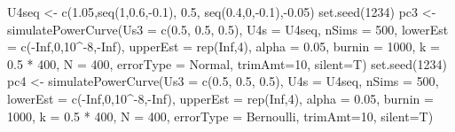 \documentclass[
]{article}
\newenvironment{Shaded}{\begin{snugshade}}{\end{snugshade}}
\newcommand{\AttributeTok}[1]{\textcolor[rgb]{0.77,0.63,0.00}{#1}}
\newcommand{\ConstantTok}[1]{\textcolor[rgb]{0.00,0.00,0.00}{#1}}
\newcommand{\DecValTok}[1]{\textcolor[rgb]{0.00,0.00,0.81}{#1}}
\newcommand{\FloatTok}[1]{\textcolor[rgb]{0.00,0.00,0.81}{#1}}
\newcommand{\FunctionTok}[1]{\textcolor[rgb]{0.00,0.00,0.00}{#1}}
\newcommand{\NormalTok}[1]{#1}
\newcommand{\OtherTok}[1]{\textcolor[rgb]{0.56,0.35,0.01}{#1}}
\newcommand{\SpecialCharTok}[1]{\textcolor[rgb]{0.00,0.00,0.00}{#1}}
\newcommand{\StringTok}[1]{\textcolor[rgb]{0.31,0.60,0.02}{#1}}
\begin{document}
\begin{Shaded}
\begin{Highlighting}[]
\NormalTok{U4seq }\OtherTok{\textless{}{-}} \FunctionTok{c}\NormalTok{(}\FloatTok{1.05}\NormalTok{,}\FunctionTok{seq}\NormalTok{(}\DecValTok{1}\NormalTok{,}\FloatTok{0.6}\NormalTok{,}\SpecialCharTok{{-}}\FloatTok{0.1}\NormalTok{), }\FloatTok{0.5}\NormalTok{, }\FunctionTok{seq}\NormalTok{(}\FloatTok{0.4}\NormalTok{,}\DecValTok{0}\NormalTok{,}\SpecialCharTok{{-}}\FloatTok{0.1}\NormalTok{),}\SpecialCharTok{{-}}\FloatTok{0.05}\NormalTok{)}
\FunctionTok{set.seed}\NormalTok{(}\DecValTok{1234}\NormalTok{)}
\NormalTok{pc3 }\OtherTok{\textless{}{-}} \FunctionTok{simulatePowerCurve}\NormalTok{(}\AttributeTok{Us3 =} \FunctionTok{c}\NormalTok{(}\FloatTok{0.5}\NormalTok{, }\FloatTok{0.5}\NormalTok{, }\FloatTok{0.5}\NormalTok{), }\AttributeTok{U4s =}\NormalTok{ U4seq,}
                     \AttributeTok{nSims =} \DecValTok{500}\NormalTok{, }\AttributeTok{lowerEst =} \FunctionTok{c}\NormalTok{(}\SpecialCharTok{{-}}\ConstantTok{Inf}\NormalTok{,}\DecValTok{0}\NormalTok{,}\DecValTok{10}\SpecialCharTok{\^{}{-}}\DecValTok{8}\NormalTok{,}\SpecialCharTok{{-}}\ConstantTok{Inf}\NormalTok{), }
                     \AttributeTok{upperEst =} \FunctionTok{rep}\NormalTok{(}\ConstantTok{Inf}\NormalTok{,}\DecValTok{4}\NormalTok{), }\AttributeTok{alpha =} \FloatTok{0.05}\NormalTok{,}
                     \AttributeTok{burnin =} \DecValTok{1000}\NormalTok{, }\AttributeTok{k =} \FloatTok{0.5} \SpecialCharTok{*} \DecValTok{400}\NormalTok{, }\AttributeTok{N =} \DecValTok{400}\NormalTok{, }
                     \AttributeTok{errorType =} \StringTok{\textquotesingle{}Normal\textquotesingle{}}\NormalTok{, }\AttributeTok{trimAmt=}\DecValTok{10}\NormalTok{,}
                     \AttributeTok{silent=}\NormalTok{T)}
\FunctionTok{set.seed}\NormalTok{(}\DecValTok{1234}\NormalTok{)}
\NormalTok{pc4 }\OtherTok{\textless{}{-}} \FunctionTok{simulatePowerCurve}\NormalTok{(}\AttributeTok{Us3 =} \FunctionTok{c}\NormalTok{(}\FloatTok{0.5}\NormalTok{, }\FloatTok{0.5}\NormalTok{, }\FloatTok{0.5}\NormalTok{), }\AttributeTok{U4s =}\NormalTok{ U4seq,}
                     \AttributeTok{nSims =} \DecValTok{500}\NormalTok{, }\AttributeTok{lowerEst =} \FunctionTok{c}\NormalTok{(}\SpecialCharTok{{-}}\ConstantTok{Inf}\NormalTok{,}\DecValTok{0}\NormalTok{,}\DecValTok{10}\SpecialCharTok{\^{}{-}}\DecValTok{8}\NormalTok{,}\SpecialCharTok{{-}}\ConstantTok{Inf}\NormalTok{), }
                     \AttributeTok{upperEst =} \FunctionTok{rep}\NormalTok{(}\ConstantTok{Inf}\NormalTok{,}\DecValTok{4}\NormalTok{), }\AttributeTok{alpha =} \FloatTok{0.05}\NormalTok{,}
                     \AttributeTok{burnin =} \DecValTok{1000}\NormalTok{, }\AttributeTok{k =} \FloatTok{0.5} \SpecialCharTok{*} \DecValTok{400}\NormalTok{, }\AttributeTok{N =} \DecValTok{400}\NormalTok{,}
                     \AttributeTok{errorType =} \StringTok{\textquotesingle{}Bernoulli\textquotesingle{}}\NormalTok{, }\AttributeTok{trimAmt=}\DecValTok{10}\NormalTok{,}
                     \AttributeTok{silent=}\NormalTok{T)}
\end{Highlighting}
\end{Shaded}
\end{document}
